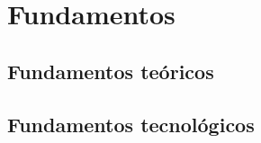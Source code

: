 \chapter{Fundamentos}
\label{chap:fundamentos}



\section{Fundamentos teóricos}
\label{sec:fundamentos_teoricos}






\section{Fundamentos tecnológicos}
\label{sec:fundamentos_tecnologicos}




